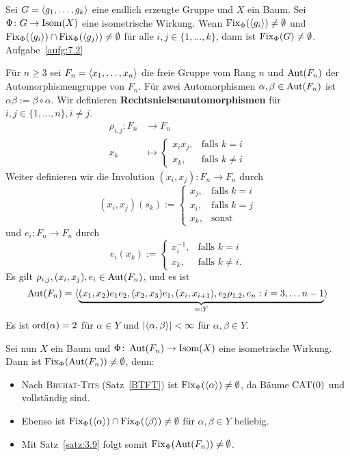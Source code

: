 \begin{satz}[Verallgemeinerung]
\label{satz:3.9}
	Sei $G = \langle g_1,\dots,g_k\rangle$ eine endlich erzeugte Gruppe und $X$ ein Baum.
	Sei $\Phi\colon G \rightarrow \operatorname{Isom}(X)$ eine isometrische Wirkung.
	Wenn $\operatorname{Fix}_\Phi(\langle g_i\rangle) \neq \emptyset$ und $\operatorname{Fix}_\Phi(\langle g_i\rangle) \cap \operatorname{Fix}_\Phi(\langle g_j\rangle) \neq \emptyset$ für alle $i,j \in \{1,\dots,k\}$, dann ist $\operatorname{Fix}_\Phi(G) \neq \emptyset$. Aufgabe~\ref{aufg:7.2}
\end{satz}

\begin{no-bsp}
\label{bsp:3.10}
	Für $n \geq 3$ sei $F_n = \langle x_1, \dots, x_n\rangle$ die freie Gruppe vom Rang $n$ und $\operatorname{Aut}(F_n)$ der Automorphismengruppe von $F_n$. 
	Für zwei Automorphismen $\alpha, \beta \in \operatorname{Aut}(F_n)$ ist $\alpha \beta := \beta \circ \alpha$.
	Wir definieren \textbf{Rechtsnielsenautomorphismen} für $i,j \in \{1, \dots, n\}, i \neq j$.
	\begin{align*}
		\rho_{i,j} \colon F_n &\longrightarrow F_n \\
		x_k &\longmapsto \begin{cases}
			x_ix_j, & \text{falls } k=i \\
			x_k, & \text{falls } k \neq i
		\end{cases}
	\end{align*}
	Weiter definieren wir die Involution $(x_i,x_j)\colon F_n \longrightarrow F_n$ durch
	\[
		(x_i,x_j)(s_k) := \begin{cases}
				x_j, & \text{falls } k=i \\
				x_i, & \text{falls } k=j \\
				x_k, & \text{sonst}
			\end{cases}
	\]
	und $e_i \colon F_n \longrightarrow F_n$ durch
	\[
		e_i(x_k) := \begin{cases}
			x_i^{-1}, & \text{falls } k = i \\
			x_k, &\text{falls } k \neq i.
		\end{cases}
	\]
	Es gilt $\rho_{i,j}, (x_i,x_j), e_i \in \operatorname{Aut}(F_n)$, und es ist
	\[
		\operatorname{Aut}(F_n) = \langle{\underbrace{(x_1,x_2)e_1e_2, (x_2,x_3)e_1, (x_i,x_{i+1}), e_2\rho_{1,2},e_n : i = 3, \dots n-1}_{=:Y}}\rangle
	\]
	Es ist $\operatorname{ord}(\alpha) = 2$ für $\alpha \in Y$ und $\left\lvert\langle\alpha,\beta\rangle\right\rvert < \infty$ für $\alpha,\beta \in Y$.
	
	Sei nun $X$ ein Baum und $\Phi\colon \operatorname{Aut}(F_n) \rightarrow \operatorname{Isom}(X)$ eine isometrische Wirkung.
	Dann ist $\operatorname{Fix}_\Phi(\operatorname{Aut}(F_n)) \neq \emptyset$, denn:
	\begin{itemize}
		\item Nach \textsc{Bruhat-Tits} (Satz~\ref{BTFT}) ist $\operatorname{Fix}_\Phi(\langle\alpha\rangle) \neq \emptyset$, da Bäume $\operatorname{CAT(0)}$ und vollständig sind.
		\item Ebenso ist $\operatorname{Fix}_\Phi(\langle\alpha\rangle) \cap \operatorname{Fix}_\Phi(\langle\beta\rangle) \neq \emptyset$ für $\alpha, \beta \in Y$ beliebig.
		\item Mit Satz~\ref{satz:3.9} folgt somit $\operatorname{Fix}_\Phi(\operatorname{Aut}(F_n)) \neq \emptyset$.
	\end{itemize}
\end{no-bsp}

